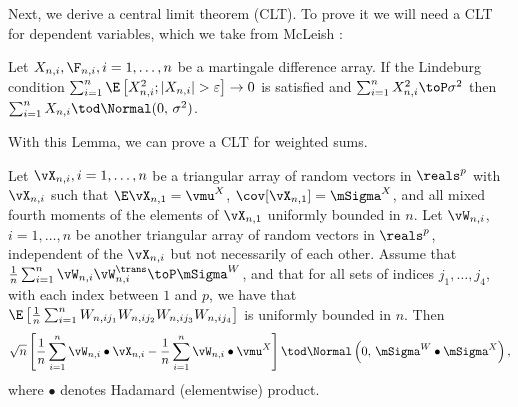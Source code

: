 Next, we derive a central limit theorem (CLT).  To prove it we will need a
CLT for dependent variables, which we take from McLeish \cite{mcleish1974dcl}:

\begin{lemma}\label{L:mcleigh}
    Let $X_{n,i}, \F_{n,i}, i = 1, \ldots, n$ be a martingale difference 
    array.  If the Lindeburg condition 
    $\sum_{i=1}^n \E \left[ X_{n,i}^2 ; | X_{n,i} | > \varepsilon \right] \to 0$
    is satisfied and $\sum_{i=1}^n X_{n,i}^2 \toP \sigma^2$ then
    $\sum_{i=1}^n X_{n,i} \tod \Normal (0, \, \sigma^2)$.
\end{lemma}

\noindent
With this Lemma, we can prove a CLT for weighted sums.

\begin{proposition}\label{P:weighted-clt}
    Let $\vX_{n,i}, i = 1, \ldots, n$ be a triangular array of random vectors
    in $\reals^p$ with $\vX_{n,i}$ \iid
    such that $\E \vX_{n,1} = \vmu^X$, $\cov[ \vX_{n,1}] = \mSigma^X$, and all 
    mixed fourth moments of the elements of $\vX_{n,1}$ uniformly bounded in 
    $n$.  Let  $\vW_{n,i}$, $i = 1, \ldots, n$ be another triangular array 
    of random 
    vectors in $\reals^p$, independent of the $\vX_{n,i}$ but not necessarily 
    of each other.  Assume that 
    $\frac{1}{n} \sum_{i=1}^n \vW_{n,i} \vW_{n,i}^\trans \toP \mSigma^W$, and 
    that for
    all sets of indices $j_1, \ldots, j_4$, with each index between $1$ and
    $p$, we have that
    \(
        \E \left[ 
            \frac{1}{n}
            \sum_{i=1}^n
                W_{n,ij_1} 
                W_{n,ij_2} 
                W_{n,ij_3} 
                W_{n,ij_4} 
        \right]
    \) is uniformly bounded in $n$.  Then
    \[
        \sqrt{n}
        \left[
            \frac{1}{n}
            \sum_{i=1}^n
                \vW_{n,i} \bullet \vX_{n,i}
            -
            \frac{1}{n} 
            \sum_{i=1}^n 
                \vW_{n,i} \bullet \vmu^X
        \right]
        \tod
        \Normal\left( 0, \, \mSigma^W \bullet \mSigma^X \right),
    \]
    where $\bullet$ denotes Hadamard (elementwise) product.
\end{proposition}
